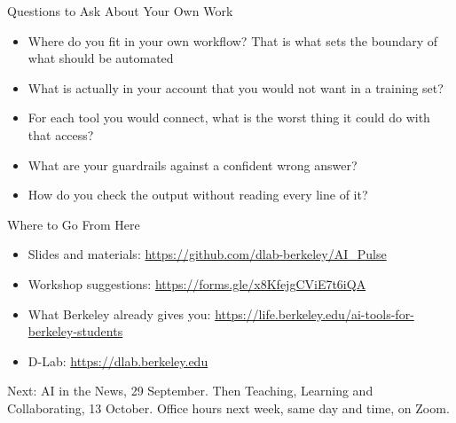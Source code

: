 \documentclass[aspectratio=169]{beamer}
\begin{document}
\begin{frame}{Questions to Ask About Your Own Work}
    \begin{itemize}\setlength{\itemsep}{9pt}
        \item Where do you fit in your own workflow? That is what sets the boundary of
              what should be automated
        \item What is actually in your account that you would not want in a training set?
        \item For each tool you would connect, what is the worst thing it could do with
              that access?
        \item What are your guardrails against a confident wrong answer?
        \item How do you check the output without reading every line of it?
    \end{itemize}
\end{frame}

\begin{frame}{Where to Go From Here}
    \begin{itemize}\setlength{\itemsep}{8pt}
        \item Slides and materials: \url{https://github.com/dlab-berkeley/AI_Pulse}
        \item Workshop suggestions: \url{https://forms.gle/x8KfejgCViE7t6iQA}
        \item What Berkeley already gives you:
              \url{https://life.berkeley.edu/ai-tools-for-berkeley-students}
        \item D-Lab: \url{https://dlab.berkeley.edu}
    \end{itemize}

    \vspace{1em}
    \begin{center}
    Next: AI in the News, 29 September. Then Teaching, Learning and Collaborating,
    13 October. Office hours next week, same day and time, on Zoom.
    \end{center}
\end{frame}
\end{document}
